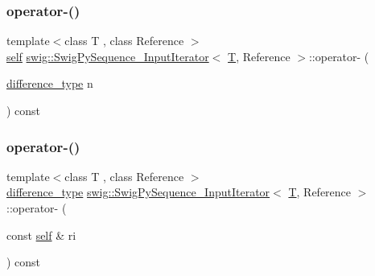 \mbox{\label{structswig_1_1_swig_py_sequence___input_iterator_aef6a178c9d3379f989dd5b1f03e744bf}} 
\subsubsection{\texorpdfstring{operator-\/()}{operator-()}\hspace{0.1cm}{\footnotesize\ttfamily [1/2]}}
{\footnotesize\ttfamily template$<$class T , class Reference $>$ \\
\hyperlink{structswig_1_1_swig_py_sequence___input_iterator_a3d3f028d1d9af412c61de2b5d8630321}{self} \hyperlink{structswig_1_1_swig_py_sequence___input_iterator}{swig\+::\+Swig\+Py\+Sequence\+\_\+\+Input\+Iterator}$<$ \hyperlink{fmt_8h_a0acb682b8260ab1c60b918599864e2e5}{T}, Reference $>$\+::operator-\/ (\begin{DoxyParamCaption}\item[{\hyperlink{structswig_1_1_swig_py_sequence___input_iterator_af5e5d3f2d1906ceaf05c2215ee388096}{difference\+\_\+type}}]{n }\end{DoxyParamCaption}) const\hspace{0.3cm}{\ttfamily [inline]}}

\mbox{\label{structswig_1_1_swig_py_sequence___input_iterator_a7261ec6cb32a1740e0e2836e2ce31495}} 
\subsubsection{\texorpdfstring{operator-\/()}{operator-()}\hspace{0.1cm}{\footnotesize\ttfamily [2/2]}}
{\footnotesize\ttfamily template$<$class T , class Reference $>$ \\
\hyperlink{structswig_1_1_swig_py_sequence___input_iterator_af5e5d3f2d1906ceaf05c2215ee388096}{difference\+\_\+type} \hyperlink{structswig_1_1_swig_py_sequence___input_iterator}{swig\+::\+Swig\+Py\+Sequence\+\_\+\+Input\+Iterator}$<$ \hyperlink{fmt_8h_a0acb682b8260ab1c60b918599864e2e5}{T}, Reference $>$\+::operator-\/ (\begin{DoxyParamCaption}\item[{const \hyperlink{structswig_1_1_swig_py_sequence___input_iterator_a3d3f028d1d9af412c61de2b5d8630321}{self} \&}]{ri }\end{DoxyParamCaption}) const\hspace{0.3cm}{\ttfamily [inline]}}

